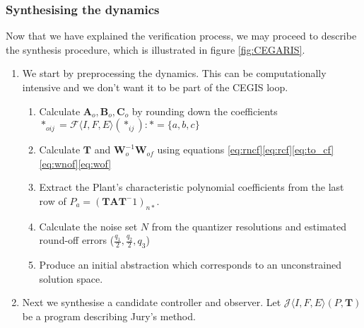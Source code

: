 \documentclass[runningheads,a4paper]{llncs}
\newcommand{\mat}[1]{\boldsymbol{#1}}
\begin{document}
\subsubsection{Synthesising the dynamics}\label{sec:cof_synth}
Now that we have explained the verification process, we may proceed to describe the synthesis procedure, which is illustrated in figure \ref{fig:CEGARIS}.
\begin{enumerate}
\item We start by preprocessing the dynamics. This can be computationally intensive and we don't want it to be part of the CEGIS loop.
\begin{enumerate}
\item Calculate $\mat{A}_o,\mat{B}_o,\mat{C}_o$ by rounding down the coefficients $*_{oij}=\mathcal{F}\langle I,F,E\rangle (*_{ij}) : *=\{a,b,c\}$
\item Calculate $\mat{T}$ and $\mat{W}_o^{-1}\mat{W}_{of}$ using equations \eqref{eq:rncf}\eqref{eq:rcf}\eqref{eq:to_cf}\eqref{eq:wnof}\eqref{eq:wof}
\item Extract the Plant's characteristic polynomial coefficients from the last row of $P_a=(\mat{T}\mat{A}\mat{T}^-1)_{n*}$.
\item Calculate the noise set $N$ from the quantizer resolutions and estimated round-off errors ($\frac{q_1}{2},\frac{q_2}{2},q_3$)
\item Produce an initial abstraction which corresponds to an unconstrained solution space.
\end{enumerate}
\item Next we synthesise a candidate controller and observer. Let $\mathcal{J}\langle I,F,E \rangle (P,\mat{T})$ be a program describing Jury's method.
\end{enumerate}
\end{document}

